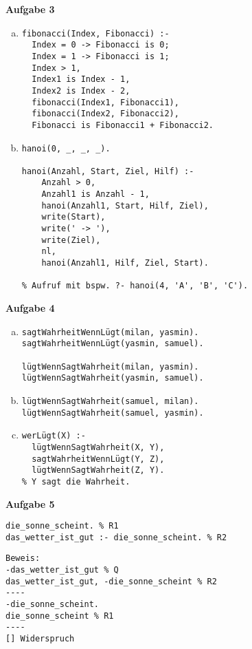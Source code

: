 \documentclass[a4paper,12pt]{article}
\newcommand{\Aufgabe}[1]{
  {
  \vspace*{0.5cm}
  \textsf{\textbf{Aufgabe #1}}
  \vspace*{0.2cm}

  }
}
\begin{document}
\Aufgabe{3}
\begin{enumerate}[a)]
  \item \begin{verbatim}
fibonacci(Index, Fibonacci) :-
  Index = 0 -> Fibonacci is 0;
  Index = 1 -> Fibonacci is 1;
  Index > 1,
  Index1 is Index - 1,
  Index2 is Index - 2,
  fibonacci(Index1, Fibonacci1),
  fibonacci(Index2, Fibonacci2),
  Fibonacci is Fibonacci1 + Fibonacci2.
\end{verbatim}
  \item \begin{verbatim}
hanoi(0, _, _, _).

hanoi(Anzahl, Start, Ziel, Hilf) :-
    Anzahl > 0,
    Anzahl1 is Anzahl - 1,
    hanoi(Anzahl1, Start, Hilf, Ziel),
    write(Start),
    write(' -> '),
    write(Ziel),
    nl,
    hanoi(Anzahl1, Hilf, Ziel, Start).

% Aufruf mit bspw. ?- hanoi(4, 'A', 'B', 'C').
  \end{verbatim}
\end{enumerate}

\Aufgabe{4}

\begin{enumerate}[a)]
  \item \begin{verbatim}
sagtWahrheitWennLügt(milan, yasmin).
sagtWahrheitWennLügt(yasmin, samuel).

lügtWennSagtWahrheit(milan, yasmin).
lügtWennSagtWahrheit(yasmin, samuel).
\end{verbatim}
  \item \begin{verbatim}
lügtWennSagtWahrheit(samuel, milan).
lügtWennSagtWahrheit(samuel, yasmin).
\end{verbatim}
  \item \begin{verbatim}
werLügt(X) :-
  lügtWennSagtWahrheit(X, Y),
  sagtWahrheitWennLügt(Y, Z),
  lügtWennSagtWahrheit(Z, Y).
% Y sagt die Wahrheit.
\end{verbatim}
\end{enumerate}

\Aufgabe{5}
\begin{verbatim}
die_sonne_scheint. % R1
das_wetter_ist_gut :- die_sonne_scheint. % R2
\end{verbatim}
\begin{verbatim}
Beweis:
-das_wetter_ist_gut % Q
das_wetter_ist_gut, -die_sonne_scheint % R2
----
-die_sonne_scheint.
die_sonne_scheint % R1
----
[] Widerspruch
\end{verbatim}

\end{document}
